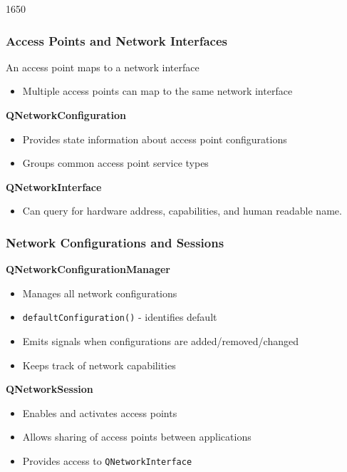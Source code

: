 \begin{slide}{1650} 
\frametitle{Access Points and Network Interfaces}
\label{QNetworkInterface}
\label{QNetworkConfiguration}
An access point maps to a network interface
\begin{itemize}
\item Multiple access points can map to the same network interface
\end{itemize}
\textbf{QNetworkConfiguration}
\begin{itemize}
\item Provides state information about access point configurations
\item Groups common access point service types
\end{itemize}
\textbf{QNetworkInterface}
\begin{itemize}
\item Can query for hardware address, capabilities, and human readable name. 
\end{itemize}
\end{slide}


\begin{slide}
\frametitle{Network Configurations and Sessions}

\textbf{QNetworkConfigurationManager}
\begin{itemize}
\item Manages all network configurations
\item \texttt{defaultConfiguration()} - identifies default
\item Emits signals when configurations are added/removed/changed
\item Keeps track of network capabilities
\end{itemize}
\textbf{QNetworkSession}
\begin{itemize}
\item Enables and activates access points
\item Allows sharing of access points between applications
\item Provides access to \texttt{QNetworkInterface}
\end{itemize}
\end{slide}
